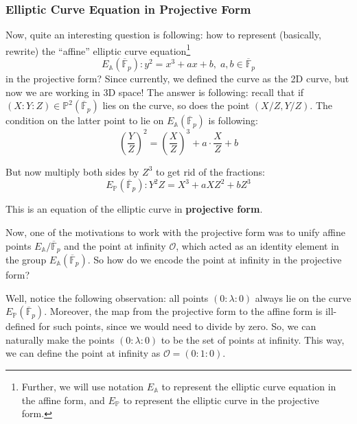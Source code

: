 \documentclass[../../book.tex]{subfiles}
\begin{document}
\subsubsection{Elliptic Curve Equation in Projective Form}

Now, quite an interesting question is following: how to represent (basically, rewrite) the ``affine'' elliptic curve equation\footnote{Further, we will use notation $E_{\mathbb{A}}$ to represent the elliptic curve equation in the affine form, and $E_{\mathbb{P}}$ to represent the elliptic curve in the projective form.}
\begin{equation*}
    E_{\mathbb{A}}(\overline{\mathbb{F}}_p): y^2 = x^3 + ax + b, \; a,b \in \overline{\mathbb{F}}_p
\end{equation*}
in the projective form? Since currently, we defined the curve as the 2D curve, but now we are working in 3D space! The answer is following: recall that if $(X:Y:Z) \in \mathbb{P}^2(\overline{\mathbb{F}}_p)$ lies on the curve, so does the point $(X/Z,Y/Z)$. The condition on the latter point to lie on $E_{\mathbb{A}}(\overline{\mathbb{F}}_p)$ is following:
\begin{equation*}
    \left(\frac{Y}{Z}\right)^2 = \left(\frac{X}{Z}\right)^3 + a\cdot \frac{X}{Z} + b
\end{equation*}

But now multiply both sides by $Z^3$ to get rid of the fractions:
\begin{equation*}
    E_{\mathbb{P}}(\overline{\mathbb{F}}_p): Y^2Z = X^3 + aXZ^2 + bZ^3
\end{equation*}

This is an equation of the elliptic curve in \textbf{projective form}. 

Now, one of the motivations to work with the projective form was to unify affine points $E_{\mathbb{A}}/\overline{\mathbb{F}}_p$ and the point at infinity $\mathcal{O}$, which acted as an identity element in the group $E_{\mathbb{A}}(\overline{\mathbb{F}}_p)$. So how do we encode the point at infinity in the projective form?

Well, notice the following observation: all points $(0:\lambda:0)$ always lie on the curve $E_{\mathbb{P}}(\overline{\mathbb{F}}_p)$. Moreover, the map from the projective form to the affine form is ill-defined for such points, since we would need to divide by zero. So, we can naturally make the points $(0:\lambda:0)$ to be the set of points at infinity. This way, we can define the point at infinity as $\mathcal{O} = (0:1:0)$.
\end{document}
